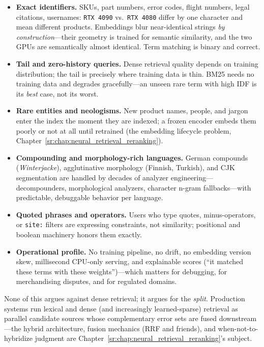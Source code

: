 \begin{itemize}
    \item \textbf{Exact identifiers.} SKUs, part numbers, error codes, flight numbers, legal citations, usernames: \texttt{RTX 4090} vs.\ \texttt{RTX 4080} differ by one character and mean different products. Embeddings blur near-identical strings \emph{by construction}---their geometry is trained for semantic similarity, and the two GPUs are semantically almost identical. Term matching is binary and correct.
    \item \textbf{Tail and zero-history queries.} Dense retrieval quality depends on training distribution; the tail is precisely where training data is thin. BM25 needs no training data and degrades gracefully---an unseen rare term with high IDF is its \emph{best} case, not its worst.
    \item \textbf{Rare entities and neologisms.} New product names, people, and jargon enter the index the moment they are indexed; a frozen encoder embeds them poorly or not at all until retrained (the embedding lifecycle problem, Chapter~\ref{sr:chap:neural_retrieval_reranking}).
    \item \textbf{Compounding and morphology-rich languages.} German compounds (\emph{Winterjacke}), agglutinative morphology (Finnish, Turkish), and CJK segmentation are handled by decades of analyzer engineering---decompounders, morphological analyzers, character n-gram fallbacks---with predictable, debuggable behavior per language.
    \item \textbf{Quoted phrases and operators.} Users who type quotes, minus-operators, or \texttt{site:} filters are expressing constraints, not similarity; positional and boolean machinery honors them exactly.
    \item \textbf{Operational profile.} No training pipeline, no drift, no embedding version skew, millisecond CPU-only serving, and explainable scores (``it matched these terms with these weights'')---which matters for debugging, for merchandising disputes, and for regulated domains.
\end{itemize}

None of this argues against dense retrieval; it argues for the \emph{split}. Production systems run lexical and dense (and increasingly learned-sparse) retrieval as parallel candidate sources whose complementary error sets are fused downstream---the hybrid architecture, fusion mechanics (RRF and friends), and when-not-to-hybridize judgment are Chapter~\ref{sr:chap:neural_retrieval_reranking}'s subject.


